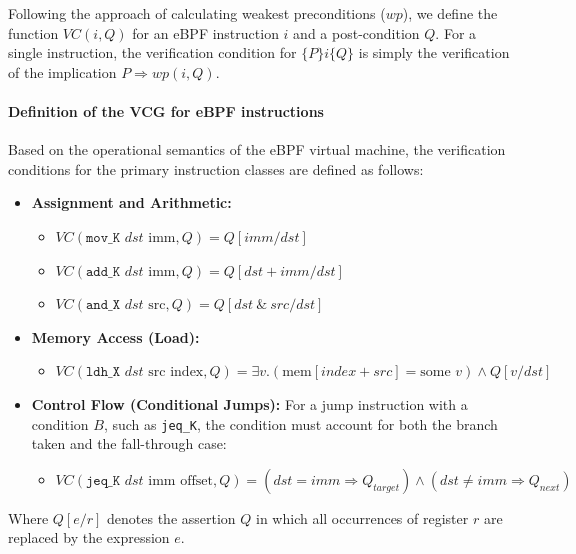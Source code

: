 \documentclass[sigconf]{acmart}
\begin{document}
Following the approach of calculating weakest preconditions ($wp$), we define the function $VC(i, Q)$ for an eBPF instruction $i$ and a post-condition $Q$. For a single instruction, the verification condition for $\{P\} i \{Q\}$ is simply the verification of the implication $P \Rightarrow wp(i, Q)$.

\paragraph{Definition of the VCG for eBPF instructions}
Based on the operational semantics of the eBPF virtual machine, the verification conditions for the primary instruction classes are defined as follows:

\begin{itemize}
    \item \textbf{Assignment and Arithmetic:}
    \begin{itemize}
        \item $VC(\texttt{mov\_K } dst \text{ imm}, Q) = Q[imm/dst]$
        \item $VC(\texttt{add\_K } dst \text{ imm}, Q) = Q[dst + imm/dst]$
        \item $VC(\texttt{and\_X } dst \text{ src}, Q) = Q[dst \ \& \ src/dst]$
    \end{itemize}
    
    \item \textbf{Memory Access (Load):}
    \begin{itemize}
        \item $VC(\texttt{ldh\_X } dst \text{ src index}, Q) = \exists v. (\text{mem}[index + src] = \text{some } v) \land Q[v/dst]$
    \end{itemize}

    \item \textbf{Control Flow (Conditional Jumps):}
    For a jump instruction with a condition $B$, such as \texttt{jeq\_K}, the condition must account for both the branch taken and the fall-through case:
    \begin{itemize}
        \item $VC(\texttt{jeq\_K } dst \text{ imm offset}, Q) = (dst = imm \Rightarrow Q_{target}) \land (dst \neq imm \Rightarrow Q_{next})$
    \end{itemize}
\end{itemize}

Where $Q[e/r]$ denotes the assertion $Q$ in which all occurrences of register $r$ are replaced by the expression $e$.
\end{document}
